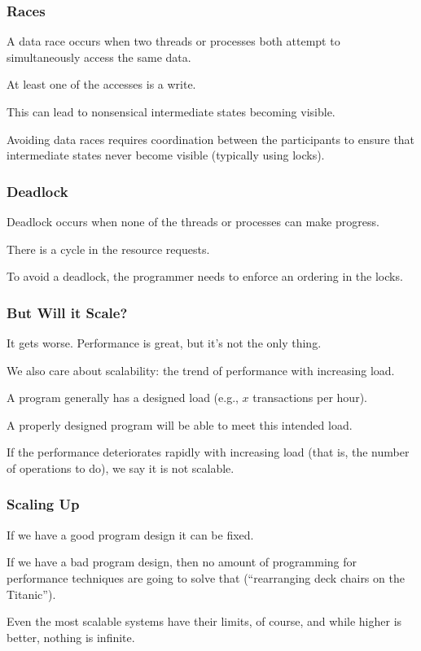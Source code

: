 \begin{frame}
\frametitle{Races}

 A \alert{data race} occurs when two threads or processes both attempt to
simultaneously access the same data.

At least one of the accesses is a write. 

This can lead to nonsensical intermediate states becoming
visible.

Avoiding data races requires
coordination between the participants to ensure that intermediate
states never become visible (typically using locks). 


\end{frame}



\begin{frame}
\frametitle{Deadlock}

 \alert{Deadlock}
occurs when none of the threads or processes can make progress.

There is a cycle in the resource requests. 

To avoid a deadlock, the programmer needs to enforce an ordering in the locks.


\end{frame}



\begin{frame}
\frametitle{But Will it Scale?}

It gets worse. Performance is great, but it's not the only thing. 

We also care about \alert{scalability}: the trend of performance with increasing load. 

A program generally has a designed load (e.g., $x$ transactions per hour). 

A properly designed program will be able to meet this intended load. 

If the performance deteriorates rapidly with increasing load (that is, the number of operations to do), we say it is \alert{not scalable}.

\end{frame}



\begin{frame}
\frametitle{Scaling Up}

If we have a good program design it can be fixed. 

If we have a bad program design, then no amount of programming for performance techniques are going to solve that (``rearranging deck chairs on the Titanic'').

Even the most scalable systems have their limits, of course, and while higher is better, nothing is infinite.

\end{frame}



